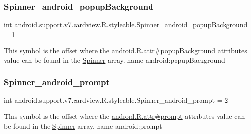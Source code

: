 \subsubsection{\texorpdfstring{Spinner\+\_\+android\+\_\+popup\+Background}{Spinner\_android\_popupBackground}}
{\footnotesize\ttfamily int android.\+support.\+v7.\+cardview.\+R.\+styleable.\+Spinner\+\_\+android\+\_\+popup\+Background = 1\hspace{0.3cm}{\ttfamily [static]}}

This symbol is the offset where the \hyperlink{}{android.\+R.\+attr\#popup\+Background} attribute\textquotesingle{}s value can be found in the \hyperlink{classandroid_1_1support_1_1v7_1_1cardview_1_1R_1_1styleable_a84bb9d44bbc6f8ef3357f2510af054d5}{Spinner} array.  name android\+:popup\+Background \mbox{\label{classandroid_1_1support_1_1v7_1_1cardview_1_1R_1_1styleable_ae19e4b2683fbfaad925e3b99991c6887}} 
\subsubsection{\texorpdfstring{Spinner\+\_\+android\+\_\+prompt}{Spinner\_android\_prompt}}
{\footnotesize\ttfamily int android.\+support.\+v7.\+cardview.\+R.\+styleable.\+Spinner\+\_\+android\+\_\+prompt = 2\hspace{0.3cm}{\ttfamily [static]}}

This symbol is the offset where the \hyperlink{}{android.\+R.\+attr\#prompt} attribute\textquotesingle{}s value can be found in the \hyperlink{classandroid_1_1support_1_1v7_1_1cardview_1_1R_1_1styleable_a84bb9d44bbc6f8ef3357f2510af054d5}{Spinner} array.  name android\+:prompt \mbox{\label{classandroid_1_1support_1_1v7_1_1cardview_1_1R_1_1styleable_ad9a6671f55c713c647bb4e3c5f60946f}} 
